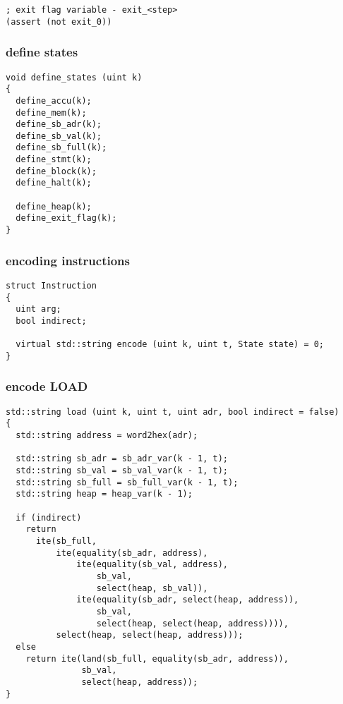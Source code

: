 \begin{lstlisting}[language=SMTLib]
; exit flag variable - exit_<step>
(assert (not exit_0))
\end{lstlisting}

\subsubsection{define states}

\begin{lstlisting}[style=c++]
void define_states (uint k)
{
  define_accu(k);
  define_mem(k);
  define_sb_adr(k);
  define_sb_val(k);
  define_sb_full(k);
  define_stmt(k);
  define_block(k);
  define_halt(k);

  define_heap(k);
  define_exit_flag(k);
}
\end{lstlisting}

\subsubsection{encoding instructions}

\begin{lstlisting}[style=c++]
struct Instruction
{
  uint arg;
  bool indirect;

  virtual std::string encode (uint k, uint t, State state) = 0;
}
\end{lstlisting}

\subsubsection{encode LOAD}

\begin{lstlisting}[style=c++]
std::string load (uint k, uint t, uint adr, bool indirect = false)
{
  std::string address = word2hex(adr);

  std::string sb_adr = sb_adr_var(k - 1, t);
  std::string sb_val = sb_val_var(k - 1, t);
  std::string sb_full = sb_full_var(k - 1, t);
  std::string heap = heap_var(k - 1);

  if (indirect)
    return
      ite(sb_full,
          ite(equality(sb_adr, address),
              ite(equality(sb_val, address),
                  sb_val,
                  select(heap, sb_val)),
              ite(equality(sb_adr, select(heap, address)),
                  sb_val,
                  select(heap, select(heap, address)))),
          select(heap, select(heap, address)));
  else
    return ite(land(sb_full, equality(sb_adr, address)),
               sb_val,
               select(heap, address));
}
\end{lstlisting}

